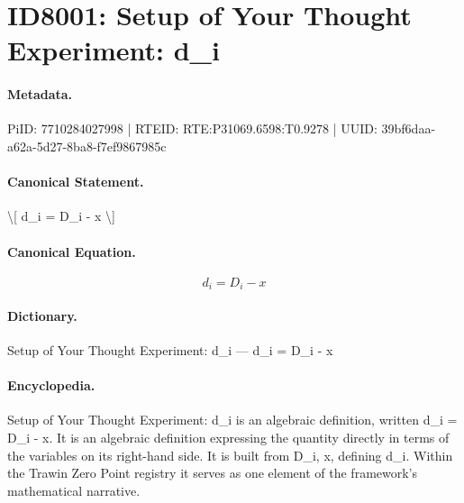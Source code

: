 \section*{ID8001: Setup of Your Thought Experiment: d\_i}
\paragraph{Metadata.}
PiID: 7710284027998 | RTEID: RTE:P31069.6598:T0.9278 | UUID: 39bf6daa-a62a-5d27-8ba8-f7ef9867985c

\paragraph{Canonical Statement.}
\textbackslash{}[ d\_i = D\_i - x \textbackslash{}]

\paragraph{Canonical Equation.}
\[
d_i = D_i - x
\]

\paragraph{Dictionary.}
Setup of Your Thought Experiment: d\_i — d\_i = D\_i - x

\paragraph{Encyclopedia.}
Setup of Your Thought Experiment: d\_i is an algebraic definition, written d\_i = D\_i - x. It is an algebraic definition expressing the quantity directly in terms of the variables on its right-hand side. It is built from D\_i, x, defining d\_i. Within the Trawin Zero Point registry it serves as one element of the framework's mathematical narrative.
